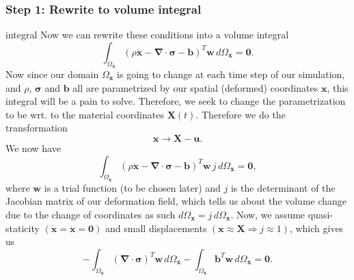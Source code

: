 \documentclass[acmtog]{acmart}
\begin{document}
\subsubsection{Step 1: Rewrite to volume integral}
integral Now we can rewrite these conditions into a volume integral
%
\begin{equation}
  \int_{\Omega_{\boldsymbol x}} (\rho \ddot{\boldsymbol x} - \boldsymbol \nabla \cdot \boldsymbol \sigma - \boldsymbol b)^T \boldsymbol w \, d{\Omega_{\boldsymbol x}} = \boldsymbol 0.
\end{equation}
%
Now since our domain $\Omega_{\boldsymbol x}$ is going to change at each time
step of our simulation, and $\rho$, $\boldsymbol \sigma$ and $\boldsymbol b$
all are parametrized by our spatial (deformed) coordinates $\boldsymbol x$,
this integral will be a pain to solve. Therefore, we seek to change the
parametrization to be wrt. to the material coordinates $\boldsymbol X(t)$.
Therefore we do the transformation
%
\begin{equation}
  \boldsymbol x \to \boldsymbol X - \boldsymbol u.
\end{equation}
%
We now have
%
\begin{equation}
  \int_{\Omega_{\boldsymbol x}} (\rho \ddot{\boldsymbol x} - \boldsymbol \nabla \cdot \boldsymbol \sigma - \boldsymbol b)^T \boldsymbol w \,j\, d{\Omega_{\boldsymbol x}} = \boldsymbol 0,
\end{equation}
%
where $\boldsymbol w$ is a trial function (to be chosen later) and $j$ is the
determinant of the Jacobian matrix of our deformation field, which tells us about the volume change due to the change of
coordinates as such $d\Omega_{\boldsymbol x} = j \, d\Omega_{\boldsymbol x}$. Now,
we assume quasi-staticity $(\dot {\boldsymbol x} = \ddot {\boldsymbol x} =
  \boldsymbol 0)$ and small displacements $(\boldsymbol x \approx \boldsymbol X
  \Rightarrow j \approx 1)$, which gives us
%
\begin{equation}
  -\int_{\Omega_{\boldsymbol x}} (\boldsymbol \nabla \cdot \boldsymbol \sigma)^T \boldsymbol w \, d\Omega_{\boldsymbol x} - \int_{\Omega_{\boldsymbol x}} \boldsymbol b^T \boldsymbol w \, d \Omega_{\boldsymbol x} = \boldsymbol 0.
\end{equation}
%
\end{document}
